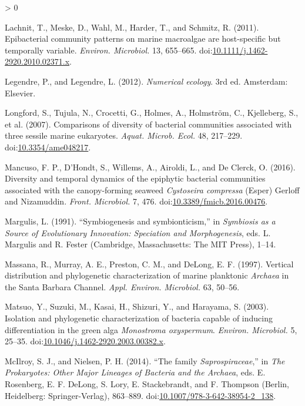 \documentclass[
  12pt,
]{article}
\newlength{\cslhangindent}
\newenvironment{CSLReferences}[2] %
 {%
  \setlength{\parindent}{0pt}
  \ifodd #1 \everypar{\setlength{\hangindent}{\cslhangindent}}\ignorespaces\fi
  \ifnum #2 > 0
  \setlength{\parskip}{#2\baselineskip}
  \fi
 }%
 {}
\begin{document}
\begin{CSLReferences}{1}{0}
\leavevmode\hypertarget{ref-Lachnit2011}{}%
Lachnit, T., Meske, D., Wahl, M., Harder, T., and Schmitz, R. (2011).
Epibacterial community patterns on marine macroalgae are host-specific
but temporally variable. \emph{Environ. Microbiol.} 13, 655--665.
doi:\href{https://doi.org/10.1111/j.1462-2920.2010.02371.x}{10.1111/j.1462-2920.2010.02371.x}.

\leavevmode\hypertarget{ref-Legendre2012}{}%
Legendre, P., and Legendre, L. (2012). \emph{Numerical ecology}. 3rd ed.
{Amsterdam}: {Elsevier}.

\leavevmode\hypertarget{ref-Longford2007}{}%
Longford, S., Tujula, N., Crocetti, G., Holmes, A., Holmström, C.,
Kjelleberg, S., et al. (2007). Comparisons of diversity of bacterial
communities associated with three sessile marine eukaryotes.
\emph{Aquat. Microb. Ecol.} 48, 217--229.
doi:\href{https://doi.org/10.3354/ame048217}{10.3354/ame048217}.

\leavevmode\hypertarget{ref-Mancuso2016}{}%
Mancuso, F. P., D'Hondt, S., Willems, A., Airoldi, L., and De Clerck, O.
(2016). Diversity and temporal dynamics of the epiphytic bacterial
communities associated with the canopy-forming seaweed {\emph{Cystoseira
compressa}} ({Esper}) {Gerloff} and {Nizamuddin}. \emph{Front.
Microbiol.} 7, 476.
doi:\href{https://doi.org/10.3389/fmicb.2016.00476}{10.3389/fmicb.2016.00476}.

\leavevmode\hypertarget{ref-Margulis1991}{}%
Margulis, L. (1991). {``Symbiogenesis and symbionticism,''} in
\emph{Symbiosis as a {Source} of {Evolutionary Innovation}: {Speciation}
and {Morphogenesis}}, eds. L. Margulis and R. Fester ({Cambridge,
Massachusetts}: {The MIT Press}), 1--14.

\leavevmode\hypertarget{ref-Massana1997}{}%
Massana, R., Murray, A. E., Preston, C. M., and DeLong, E. F. (1997).
Vertical distribution and phylogenetic characterization of marine
planktonic {\emph{Archaea}} in the {Santa Barbara Channel}. \emph{Appl.
Environ. Microbiol.} 63, 50--56.

\leavevmode\hypertarget{ref-Matsuo2003}{}%
Matsuo, Y., Suzuki, M., Kasai, H., Shizuri, Y., and Harayama, S. (2003).
Isolation and phylogenetic characterization of bacteria capable of
inducing differentiation in the green alga {\emph{Monostroma
oxyspermum}}. \emph{Environ. Microbiol.} 5, 25--35.
doi:\href{https://doi.org/10.1046/j.1462-2920.2003.00382.x}{10.1046/j.1462-2920.2003.00382.x}.

\leavevmode\hypertarget{ref-McIlroy2014}{}%
McIlroy, S. J., and Nielsen, P. H. (2014). {``The family
{\emph{Saprospiraceae}},''} in \emph{The {Prokaryotes}: {Other Major
Lineages} of {Bacteria} and the {Archaea}}, eds. E. Rosenberg, E. F.
DeLong, S. Lory, E. Stackebrandt, and F. Thompson ({Berlin, Heidelberg}:
{Springer-Verlag}), 863--889.
doi:\href{https://doi.org/10.1007/978-3-642-38954-2_138}{10.1007/978-3-642-38954-2\_138}.


\end{CSLReferences}
\end{document}
